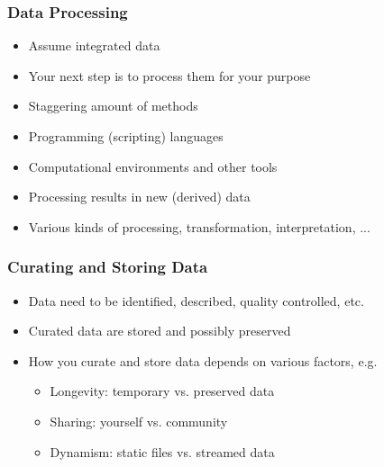 \documentclass{beamer}
\begin{document}
\begin{frame}
  \frametitle{Data Processing}
  
  \begin{itemize}
  \item Assume integrated data
  \item Your next step is to process them for your purpose
  \item Staggering amount of methods
  \item Programming (scripting) languages
  \item Computational environments and other tools
  \item Processing results in new (derived) data
  \item Various kinds of processing, transformation, interpretation, ...
  \end{itemize}
\end{frame}

\begin{frame}
  \frametitle{Curating and Storing Data}
  
  \begin{itemize}
  \item Data need to be identified, described, quality controlled, etc.
  \item Curated data are stored and possibly preserved
  \item How you curate and store data depends on various factors, e.g.
  \begin{itemize}
  \item Longevity: temporary vs. preserved data
  \item Sharing: yourself vs. community
  \item Dynamism: static files vs. streamed data
  \end{itemize}
  \end{itemize}
\end{frame}
\end{document}

